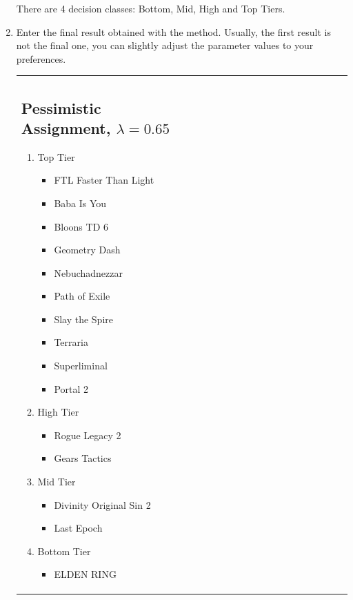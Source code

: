\documentclass{article}
\begin{document}
\begin{enumerate}
    There are 4 decision classes: Bottom, Mid, High and Top Tiers.

    \item Enter the final result obtained with the method. Usually, the first result is not the final one, you can
    slightly adjust the parameter values to your preferences.

    \begin{tabular}{m{0.5\linewidth}m{0.5\linewidth}}
        \subsection*{Pessimistic Assignment, $\lambda = 0.65$}
        \begin{enumerate}
            \item Top Tier
                \begin{itemize}
                    \item FTL Faster Than Light
                    \item Baba Is You
                    \item Bloons TD 6
                    \item Geometry Dash
                    \item Nebuchadnezzar
                    \item Path of Exile
                    \item Slay the Spire
                    \item Terraria
                    \item Superliminal
                    \item Portal 2
                \end{itemize}
            \item High Tier
                \begin{itemize}
                    \item Rogue Legacy 2
                    \item Gears Tactics
                \end{itemize}
            \item Mid Tier
                \begin{itemize}
                    \item Divinity Original Sin 2
                    \item Last Epoch
                \end{itemize}
            \item Bottom Tier
                \begin{itemize}
                    \item ELDEN RING
                \end{itemize}
        \end{enumerate} &

\end{tabular}
\end{enumerate}
\end{document}
